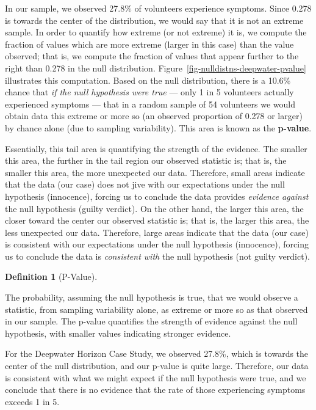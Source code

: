 \documentclass[
  letterpaper,
  DIV=11,
  numbers=noendperiod]{scrreprt}
\theoremstyle{plain}
\theoremstyle{definition}
\theoremstyle{definition}
\newtheorem{definition}{Definition}[chapter]
\theoremstyle{remark}
\begin{document}
In our sample, we observed 27.8\% of volunteers experience symptoms.
Since 0.278 is towards the center of the distribution, we would say that
it is not an extreme sample. In order to quantify how extreme (or not
extreme) it is, we compute the fraction of values which are more extreme
(larger in this case) than the value observed; that is, we compute the
fraction of values that appear further to the right than 0.278 in the
null distribution. Figure~\ref{fig-nulldistns-deepwater-pvalue}
illustrates this computation. Based on the null distribution, there is a
10.6\% chance that \emph{if the null hypothesis were true} --- only 1 in
5 volunteers actually experienced symptoms --- that in a random sample
of 54 volunteers we would obtain data this extreme or more so (an
observed proportion of 0.278 or larger) by chance alone (due to sampling
variability). This area is known as the \textbf{p-value}.

Essentially, this tail area is quantifying the strength of the evidence.
The smaller this area, the further in the tail region our observed
statistic is; that is, the smaller this area, the more unexpected our
data. Therefore, small areas indicate that the data (our case) does not
jive with our expectations under the null hypothesis (innocence),
forcing us to conclude the data provides \emph{evidence against} the
null hypothesis (guilty verdict). On the other hand, the larger this
area, the closer toward the center our observed statistic is; that is,
the larger this area, the less unexpected our data. Therefore, large
areas indicate that the data (our case) is consistent with our
expectations under the null hypothesis (innocence), forcing us to
conclude the data is \emph{consistent with} the null hypothesis (not
guilty verdict).

\begin{definition}[P-Value]\protect\hypertarget{def-pvalue}{}\label{def-pvalue}

The probability, assuming the null hypothesis is true, that we would
observe a statistic, from sampling variability alone, as extreme or more
so as that observed in our sample. The p-value quantifies the strength
of evidence against the null hypothesis, with smaller values indicating
stronger evidence.

\end{definition}

For the Deepwater Horizon Case Study, we observed 27.8\%, which is
towards the center of the null distribution, and our p-value is quite
large. Therefore, our data is consistent with what we might expect if
the null hypothesis were true, and we conclude that there is no evidence
that the rate of those experiencing symptoms exceeds 1 in 5.
\end{document}
